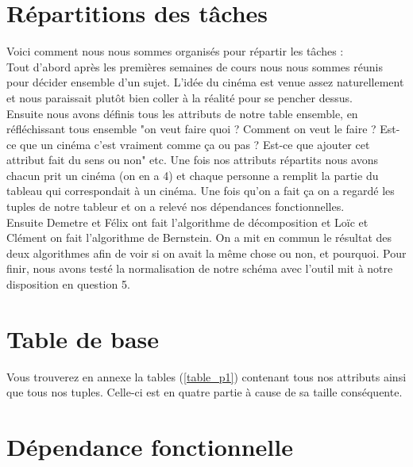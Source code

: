 \documentclass[a4paper,sffamily,12pt]{article}
\begin{document}
	\section{Répartitions des tâches}

		\vspace{0.5cm}

		\noindent Voici comment nous nous sommes organisés pour répartir les tâches : \\
		\indent Tout d'abord après les premières semaines de cours nous nous sommes réunis pour décider ensemble d'un sujet. L'idée du cinéma est venue assez naturellement et nous paraissait plutôt bien coller à la réalité pour se pencher dessus.\\
		\indent Ensuite nous avons définis tous les attributs de notre table ensemble, en réfléchissant tous ensemble "on veut faire quoi ? Comment on veut le faire ? Est-ce que un cinéma c'est vraiment comme ça ou pas ? Est-ce que ajouter cet attribut fait du sens ou non" etc. Une fois nos attributs répartits nous avons chacun prit un cinéma (on en a 4) et chaque personne a remplit la partie du tableau qui correspondait à un cinéma. Une fois qu'on a fait ça on a regardé les tuples de notre tableur et on a relevé nos dépendances fonctionnelles.\\
		\indent Ensuite Demetre et Félix ont fait l'algorithme de décomposition et Loïc et Clément on fait l'algorithme de Bernstein. On a mit en commun le résultat des deux algorithmes afin de voir si on avait la même chose ou non, et pourquoi. Pour finir, nous avons testé la normalisation de notre schéma avec l'outil mit à notre disposition en question 5.
						
		\vspace{0.5cm}
		
	\section{Table de base}	
		
		\vspace{0.5cm}
			
		Vous trouverez en annexe la tables (\ref{table_p1}) contenant tous nos attributs ainsi que tous nos tuples. Celle-ci est en quatre partie à cause de sa taille conséquente.
		
		\vspace{0.5cm}						

	\section{Dépendance fonctionnelle}
	
\end{document}
